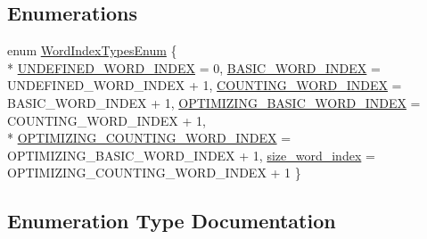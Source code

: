 \subsection*{Enumerations}
\begin{DoxyCompactItemize}
\item 
enum \hyperlink{namespaceuva_1_1smt_1_1tries_1_1dictionary_a2d9d8547b613df614eb53c510c5223af}{Word\+Index\+Types\+Enum} \{ \\*
\hyperlink{namespaceuva_1_1smt_1_1tries_1_1dictionary_a2d9d8547b613df614eb53c510c5223afad3e5d3a48d4d42353e379d2488e69929}{U\+N\+D\+E\+F\+I\+N\+E\+D\+\_\+\+W\+O\+R\+D\+\_\+\+I\+N\+D\+E\+X} = 0, 
\hyperlink{namespaceuva_1_1smt_1_1tries_1_1dictionary_a2d9d8547b613df614eb53c510c5223afa9d7aca4b6d0108c0e7b6b5336147f702}{B\+A\+S\+I\+C\+\_\+\+W\+O\+R\+D\+\_\+\+I\+N\+D\+E\+X} = U\+N\+D\+E\+F\+I\+N\+E\+D\+\_\+\+W\+O\+R\+D\+\_\+\+I\+N\+D\+E\+X + 1, 
\hyperlink{namespaceuva_1_1smt_1_1tries_1_1dictionary_a2d9d8547b613df614eb53c510c5223afaea9522a585dd461e969eaecd2d0b86d5}{C\+O\+U\+N\+T\+I\+N\+G\+\_\+\+W\+O\+R\+D\+\_\+\+I\+N\+D\+E\+X} = B\+A\+S\+I\+C\+\_\+\+W\+O\+R\+D\+\_\+\+I\+N\+D\+E\+X + 1, 
\hyperlink{namespaceuva_1_1smt_1_1tries_1_1dictionary_a2d9d8547b613df614eb53c510c5223afaf2e0211e595a151b4406e638e20f0385}{O\+P\+T\+I\+M\+I\+Z\+I\+N\+G\+\_\+\+B\+A\+S\+I\+C\+\_\+\+W\+O\+R\+D\+\_\+\+I\+N\+D\+E\+X} = C\+O\+U\+N\+T\+I\+N\+G\+\_\+\+W\+O\+R\+D\+\_\+\+I\+N\+D\+E\+X + 1, 
\\*
\hyperlink{namespaceuva_1_1smt_1_1tries_1_1dictionary_a2d9d8547b613df614eb53c510c5223afa0318ba9b612a49c6e578b9961e404cd5}{O\+P\+T\+I\+M\+I\+Z\+I\+N\+G\+\_\+\+C\+O\+U\+N\+T\+I\+N\+G\+\_\+\+W\+O\+R\+D\+\_\+\+I\+N\+D\+E\+X} = O\+P\+T\+I\+M\+I\+Z\+I\+N\+G\+\_\+\+B\+A\+S\+I\+C\+\_\+\+W\+O\+R\+D\+\_\+\+I\+N\+D\+E\+X + 1, 
\hyperlink{namespaceuva_1_1smt_1_1tries_1_1dictionary_a2d9d8547b613df614eb53c510c5223afa7d1ffdd83a625017428ac58e56b57bc1}{size\+\_\+word\+\_\+index} = O\+P\+T\+I\+M\+I\+Z\+I\+N\+G\+\_\+\+C\+O\+U\+N\+T\+I\+N\+G\+\_\+\+W\+O\+R\+D\+\_\+\+I\+N\+D\+E\+X + 1
 \}
\end{DoxyCompactItemize}


\subsection{Enumeration Type Documentation}
\hypertarget{namespaceuva_1_1smt_1_1tries_1_1dictionary_a2d9d8547b613df614eb53c510c5223af}{}
